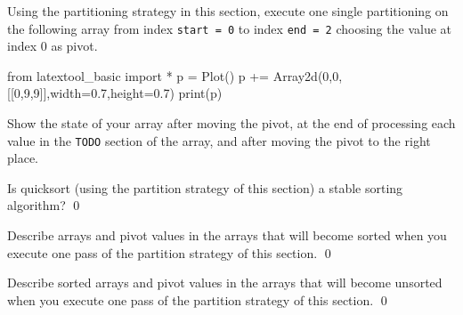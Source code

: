 \newpage
\begin{ex}
\begin{tightlist}
\item Using the partitioning strategy in this section,
execute one single partitioning on the following array
from index \verb!start = 0! to index \verb!end = 2!
choosing the value at index 0 as pivot.

\begin{python}
from latextool_basic import *
p = Plot()
p += Array2d(0,0,[[0,9,9]],width=0.7,height=0.7)
print(p)
\end{python}

Show the state of your array after moving the pivot, at the end of
processing each value in the \verb!TODO! section of the array,
and after moving the pivot to the right place.
\item Is quicksort (using the partition strategy of this section)
a stable sorting algorithm?
\qed
\end{tightlist}
\end{ex}


\newpage
\begin{ex}
Describe arrays and pivot values in the arrays that will become
sorted when you execute one pass of the partition strategy of this section.
\qed
\end{ex}


\newpage
\begin{ex}
Describe sorted arrays and pivot values in the arrays that will become
unsorted when you execute one pass of the partition strategy of this section.
\qed
\end{ex}

